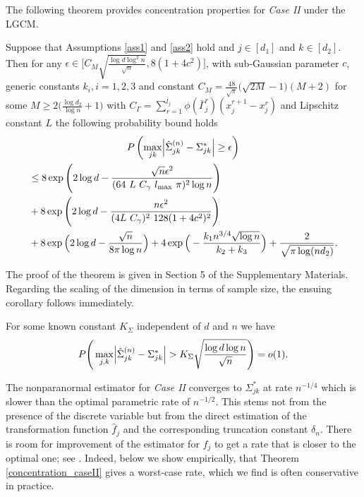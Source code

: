 \noindent The following theorem provides concentration properties for \textit{Case II} under the LGCM.
\begin{theorem}\label{concentration_caseII}
    Suppose that Assumptions \ref{ass1} and \ref{ass2} hold and $j \in [d_1]$ and $k \in [d_2]$. Then for any $\epsilon \in \Big[C_M\sqrt{\frac{\log d \log^2 n}{\sqrt{n}}},8(1+4c^2)\Big]$, with sub-Gaussian parameter $c$, generic constants $k_i, i = 1,2,3$ and constant $C_M = \frac{48}{\sqrt{\pi}} \big(\sqrt{2M} - 1\big)(M+2)$ for some $M \geq 2\big(\frac{\log d_2}{\log n} +1\big)$ with $C_\Gamma = \sum_{r=1}^{l_j} \phi(\bar{\Gamma}_j^r)(x_j^{r+1} - x_j^r)$ and Lipschitz constant $L$ the following probability bound holds
    \begin{multline*}
        P\left(\max_{jk}\abs{\hat{\Sigma}_{jk}^{(n)} -  \Sigma_{jk}^{*}} \geq \epsilon \right) \\
        \begin{aligned}
        &\leq 8\exp\Bigg(2\log d - \frac{\sqrt{n}\epsilon^2}{(64 \ L \ C_\gamma \ l_{\max} \ \pi)^2 \log n}\Bigg) \\
        &+ 8\exp\left( 2\log d - \frac{n \epsilon^2}{(4L \ C_\gamma)^2 \ 128(1+4c^2)^2} \right) \\
        &+ 8\exp\Big(2\log d - \frac{\sqrt{n}}{8\pi\log n}\Big) + 4\exp\Big(- \frac{k_1 n^{3/4} \sqrt{\log n}}{k_2+ k_3} \Big) + \frac{2}{\sqrt{\pi \log(nd_2)}}.
        \end{aligned}
    \end{multline*}

\end{theorem}
The proof of the theorem is given in Section 5
of the Supplementary Materials. Regarding the scaling of the dimension in terms of sample size, the ensuing corollary follows immediately.
\begin{corollary}
    For some known constant $K_{\Sigma}$ independent of $d$ and $n$ we have
    \begin{equation}
        P\Bigg(\max_{j,k}\abs{\hat{\Sigma}_{jk}^{(n)} - \Sigma_{jk}^*} > K_{\Sigma}\sqrt{\frac{\log d \log n}{\sqrt{n}}} \Bigg) = o(1).
    \end{equation}
\end{corollary}

The nonparanormal estimator for \textit{Case II} converges to \(\Sigma_{jk}^*\) at rate \(n^{-1/4}\) which is slower than the optimal parametric rate of \(n^{-1/2}\). This stems not from the presence of the discrete variable but from the direct estimation of the transformation function \(\hat{f}_j\) and the corresponding truncation constant \(\delta_n\). There is room for improvement of the estimator for \(f_j\) to get a rate that is closer to the optimal one; see \citep{Xue12}. Indeed, below we show empirically, that Theorem \ref{concentration_caseII} gives a worst-case rate, which we find is often conservative in practice.


